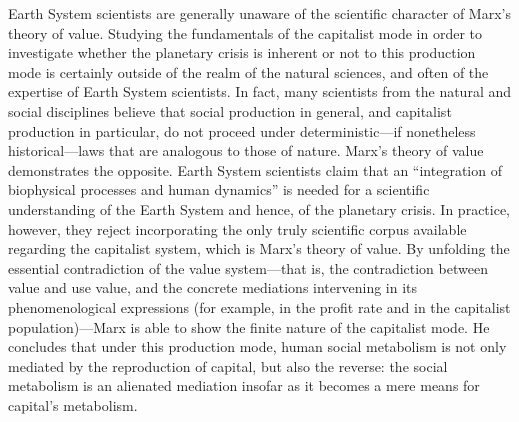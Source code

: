 \documentclass[
]{book}
\begin{document}
Earth System scientists are generally unaware of the scientific character of Marx's theory of value. Studying the fundamentals of the capitalist mode in order to investigate whether the planetary crisis is inherent or not to this production mode is certainly outside of the realm of the natural sciences, and often of the expertise of Earth System scientists. In fact, many scientists from the natural and social disciplines believe that social production in general, and capitalist production in particular, do not proceed under deterministic---if nonetheless historical---laws that are analogous to those of nature. Marx's theory of value demonstrates the opposite. Earth System scientists claim that an ``integration of biophysical processes and human dynamics'' is needed for a scientific understanding of the Earth System and hence, of the planetary crisis. In practice, however, they reject incorporating the only truly scientific corpus available regarding the capitalist system, which is Marx's theory of value. By unfolding the essential contradiction of the value system---that is, the contradiction between value and use value, and the concrete mediations intervening in its phenomenological expressions (for example, in the profit rate and in the capitalist population)---Marx is able to show the finite nature of the capitalist mode. He concludes that under this production mode, human social metabolism is not only mediated by the reproduction of capital, but also the reverse: the social metabolism is an alienated mediation insofar as it becomes a mere means for capital's metabolism.
\end{document}
